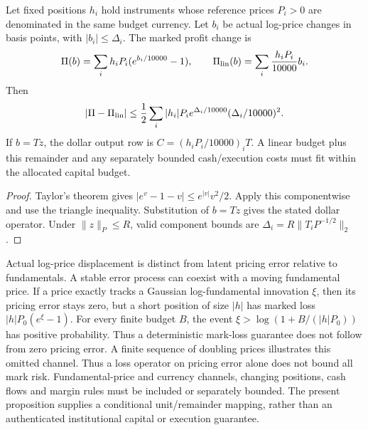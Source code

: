 \begin{proposition}
\label{prop:mark_to_dollar}
Let fixed positions $h_i$ hold instruments whose reference prices $P_i>0$ are denominated in the same budget currency. Let $b_i$ be actual log-price changes in basis points, with $|b_i|\le\Delta_i$. The marked profit change is
\[
\Pi(b)=\sum_i h_iP_i(e^{b_i/10000}-1),\qquad
\Pi_{\rm lin}(b)=\sum_i\frac{h_iP_i}{10000}b_i.
\]
Then
\[
|\Pi-\Pi_{\rm lin}|\le
\frac12\sum_i |h_i|P_i e^{\Delta_i/10000}(\Delta_i/10000)^2.
\]
If $b=Tz$, the dollar output row is $C=(h_iP_i/10000)_iT$. A linear budget plus this remainder and any separately bounded cash/execution costs must fit within the allocated capital budget.
\end{proposition}
\begin{proof}
Taylor's theorem gives $|e^v-1-v|\le e^{|v|}v^2/2$. Apply this componentwise and use the triangle inequality. Substitution of $b=Tz$ gives the stated dollar operator. Under $\|z\|_P\le R$, valid component bounds are $\Delta_i=R\|T_iP^{-1/2}\|_2$.
\end{proof}
Actual log-price displacement is distinct from latent pricing error relative to fundamentals. A stable error process can coexist with a moving fundamental price. If a price exactly tracks a Gaussian log-fundamental innovation $\xi$, then its pricing error stays zero, but a short position of size $|h|$ has marked loss $|h|P_0(e^\xi-1)$. For every finite budget $B$, the event $\xi>\log(1+B/(|h|P_0))$ has positive probability. Thus a deterministic mark-loss guarantee does not follow from zero pricing error. A finite sequence of doubling prices illustrates this omitted channel. Thus a loss operator on pricing error alone does not bound all mark risk. Fundamental-price and currency channels, changing positions, cash flows and margin rules must be included or separately bounded. The present proposition supplies a conditional unit/remainder mapping, rather than an authenticated institutional capital or execution guarantee.

